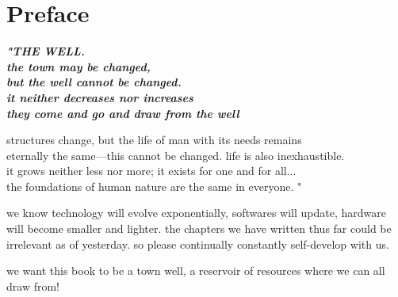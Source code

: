 
\SkipTocEntry\chapter*{Preface}
\addtocounter{section}{1}
\begin{fullwidth}

{\itshape\bfseries "THE WELL.
\\
the town may be changed,
\\
but the well cannot be changed.
\\
it neither decreases nor increases
\\
they come and go and draw from the well

structures change, but the life of man with its needs remains
\\
eternally the same—this cannot be changed. life is also inexhaustible. 
\\
it grows neither less nor more; it exists for one and for all...
\\
the foundations of human nature are the same in everyone. "
}

we know technology will evolve exponentially, softwares will update, hardware will become smaller and lighter. the chapters we have written thus far could be irrelevant as of yesterday. so please continually constantly self-develop with us. 

we want this book to be a town well, a reservoir of resources where we can all draw from!

\clearpage
\end{fullwidth}

